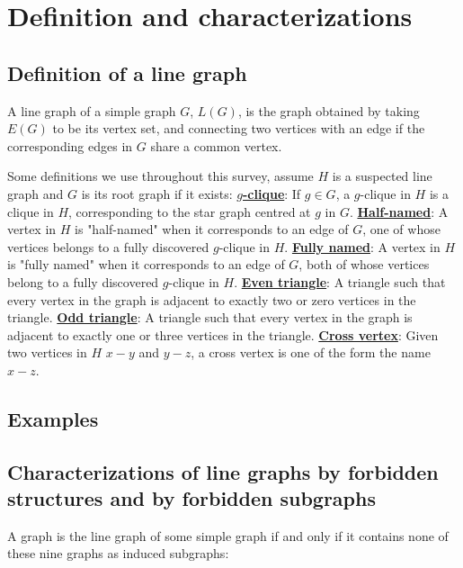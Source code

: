 \documentclass[11pt]{article}
\begin{document}
\section{Definition and characterizations}
\subsection{Definition of a line graph}
A line graph of a simple graph $G$, $L(G)$, is the graph obtained by taking
$E(G)$ to be its vertex set, and connecting two vertices with an edge if the
corresponding edges in $G$ share a common vertex.

Some definitions we use throughout this survey, assume $H$ is a suspected line
graph and $G$ is its root graph if it exists:
\newline
\underline{\textbf{$g$-clique}}: If $g\in G$, a $g$-clique in $H$ is a clique
in $H$, corresponding to the star graph centred at $g$ in $G$.
\newline
\underline{\textbf{Half-named}}: A vertex in $H$ is "half-named" when it
corresponds to an edge of $G$, one of whose vertices belongs to a fully
discovered $g$-clique in $H$.
\newline
\underline{\textbf{Fully named}}: A vertex in $H$ is "fully named" when it
corresponds to an edge of $G$, both of whose vertices belong to a fully
discovered $g$-clique in $H$.
\newline
\underline{\textbf{Even triangle}}: A triangle such that every vertex in the
graph is adjacent to exactly two or zero vertices in the triangle.
\newline
\underline{\textbf{Odd triangle}}: A triangle  such that every vertex in the
graph is adjacent to exactly one or three vertices in the triangle.
\newline
\underline{\textbf{Cross vertex}}: Given two vertices in $H$ $x-y$ and $y-z$,
a cross vertex is one of the form the name $x-z$.


\subsection{Examples}
\begin{figure}[H]
\centering

\end{figure}
\begin{figure}[H]
\centering

\end{figure}


\subsection{Characterizations of line graphs by forbidden structures and by forbidden subgraphs}
A graph is the line graph of some simple graph if and only if it contains none
of these nine graphs as induced subgraphs\cite{vanRooij}:
\end{document}
